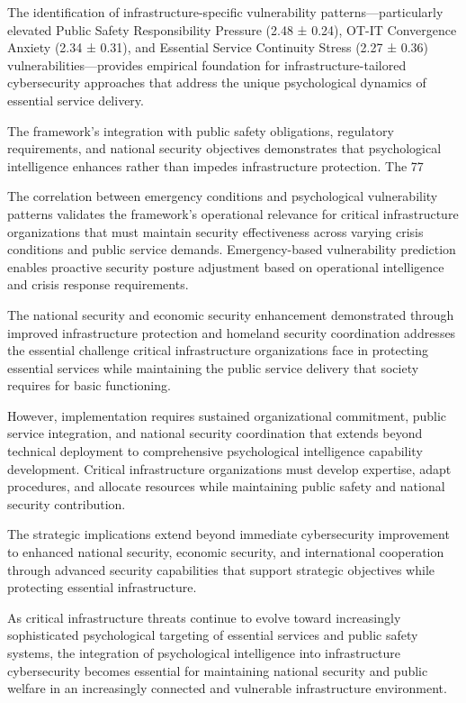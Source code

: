 \documentclass[10pt, twocolumn]{article}
\begin{document}
The identification of infrastructure-specific vulnerability patterns—particularly elevated Public Safety Responsibility Pressure (2.48 ± 0.24), OT-IT Convergence Anxiety (2.34 ± 0.31), and Essential Service Continuity Stress (2.27 ± 0.36) vulnerabilities—provides empirical foundation for infrastructure-tailored cybersecurity approaches that address the unique psychological dynamics of essential service delivery.

The framework's integration with public safety obligations, regulatory requirements, and national security objectives demonstrates that psychological intelligence enhances rather than impedes infrastructure protection. The 77%

The correlation between emergency conditions and psychological vulnerability patterns validates the framework's operational relevance for critical infrastructure organizations that must maintain security effectiveness across varying crisis conditions and public service demands. Emergency-based vulnerability prediction enables proactive security posture adjustment based on operational intelligence and crisis response requirements.

The national security and economic security enhancement demonstrated through improved infrastructure protection and homeland security coordination addresses the essential challenge critical infrastructure organizations face in protecting essential services while maintaining the public service delivery that society requires for basic functioning.

However, implementation requires sustained organizational commitment, public service integration, and national security coordination that extends beyond technical deployment to comprehensive psychological intelligence capability development. Critical infrastructure organizations must develop expertise, adapt procedures, and allocate resources while maintaining public safety and national security contribution.

The strategic implications extend beyond immediate cybersecurity improvement to enhanced national security, economic security, and international cooperation through advanced security capabilities that support strategic objectives while protecting essential infrastructure.

As critical infrastructure threats continue to evolve toward increasingly sophisticated psychological targeting of essential services and public safety systems, the integration of psychological intelligence into infrastructure cybersecurity becomes essential for maintaining national security and public welfare in an increasingly connected and vulnerable infrastructure environment.
\end{document}
